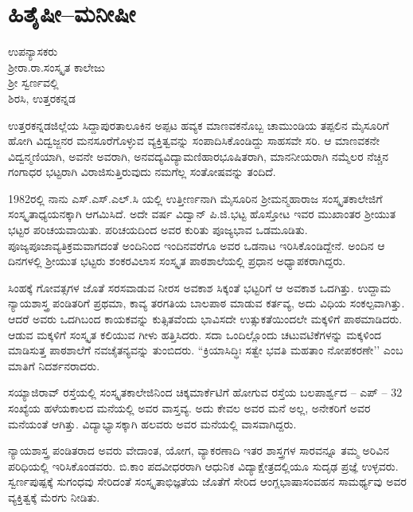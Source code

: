 {\fontsize{14}{16}\selectfont
\chapter{ಹಿತೈಷೀ–ಮನೀಷೀ}

\begin{center}
\smallskip

ಉಪನ್ಯಾಸಕರು\\ 
ಶ್ರೀರಾ.ರಾ.ಸಂಸ್ಕೃತ ಕಾಲೇಜು\\
ಶ್ರೀ ಸ್ವರ್ಣವಲ್ಲಿ\\
ಶಿರಸಿ, ಉತ್ತರಕನ್ನಡ
\addrule
\end{center}

ಉತ್ತರಕನ್ನಡಜಿಲ್ಲೆಯ ಸಿದ್ದಾಪುರತಾಲೂಕಿನ ಅಪ್ಪಟ ಹವ್ಯಕ ಮಾಣವಕನೊಬ್ಬ ಚಾಮುಂಡಿಯ ತಪ್ಪಲಿನ ಮೈಸೂರಿಗೆ ಹೋಗಿ ವಿದ್ವಜ್ಜನರ ಮನಸೂರೆಗೊಳ್ಳುವ ವ್ಯಕ್ತಿತ್ವವನ್ನು ಸಂಪಾದಿಸಿಕೊಂಡಿದ್ದು ಸಾಹಸವೇ ಸರಿ. ಆ ಮಾಣವಕನೇ ವಿದ್ವನ್ಮಣಿಯಾಗಿ, ಅವನೇ ಅವರಾಗಿ, ಅನವದ್ಯವಿದ್ಯಾಮಣಿಹಾರಭೂಷಿತರಾಗಿ, ಮಾನನೀಯರಾಗಿ ನಮ್ಮೆಲರ ನೆಚ್ಚಿನ ಗಂಗಾಧರ ಭಟ್ಟರಾಗಿ ವಿರಾಜಿಸುತ್ತಿರುವುದು ನಮಗೆಲ್ಲ ಸಂತೋಷವನ್ನು ತಂದಿದೆ.

1982ರಲ್ಲಿ ನಾನು  ಎಸ್.ಎಸ್.ಎಲ್.ಸಿ ಯಲ್ಲಿ ಉತ್ತೀರ್ಣನಾಗಿ ಮೈಸೂರಿನ ಶ್ರೀಮನ್ಮಹಾರಾಜ ಸಂಸ್ಕೃತಕಾಲೇಜಿಗೆ ಸಂಸ್ಕೃತಾಧ್ಯಯನಕ್ಕಾಗಿ ಆಗಮಿಸಿದೆ. ಅದೇ ವರ್ಷ ವಿದ್ವಾನ್ ಪಿ.ಜಿ.ಭಟ್ಟ ಹೊಸ್ತೋಟ ಇವರ ಮುಖಾಂತರ ಶ್ರೀಯುತ ಭಟ್ಟರ ಪರಿಚಯವಾಯಿತು. ಪರಿಚಯದಿಂದ ಅವರ ಕುರಿತು ಪೂಜ್ಯಭಾವ ಒಡಮೂಡಿತು. ಪೂಜ್ಯಪೂಜಾವ್ಯತಿಕ್ರಮವಾಗದಂತೆ ಅಂದಿನಿಂದ ಇಂದಿನವರೆಗೂ ಅವರ ಒಡನಾಟ ಇರಿಸಿಕೊಂಡಿದ್ದೇನೆ. ಅಂದಿನ ಆ ದಿನಗಳಲ್ಲಿ ಶ್ರೀಯುತ ಭಟ್ಟರು ಶಂಕರವಿಲಾಸ ಸಂಸ್ಕೃತ ಪಾಠಶಾಲೆಯಲ್ಲಿ ಪ್ರಧಾನ ಅಧ್ಯಾಪಕರಾಗಿದ್ದರು.

ಸಿಂಹಕ್ಕೆ ಗೋವತ್ಸಗಳ ಜೊತೆ ಸರಸವಾಡುವ ನೀರಸ ಅವಕಾಶ ಸಿಕ್ಕಂತೆ ಭಟ್ಟರಿಗೆ ಆ ಅವಕಾಶ ಒದಗಿತ್ತು. ಉದ್ದಾಮ ನ್ಯಾಯಶಾಸ್ತ್ರ ಪಂಡಿತರಿಗೆ ಪ್ರಥಮಾ, ಕಾವ್ಯ ತರಗತಿಯ ಬಾಲಪಾಠ ಮಾಡುವ ಕರ್ತವ್ಯ, ಅದು ವಿಧಿಯ ಸಂಕಲ್ಪವಾಗಿತ್ತು.  ಆದರೆ ಅವರು ಒದಗಿಬಂದ ಕಾಯಕವನ್ನು ಕುತ್ಸಿತವೆಂದು ಭಾವಿಸದೇ  ಉತ್ಸುಕತೆಯಿಂದಲೇ ಮಕ್ಕಳಿಗೆ ಪಾಠಮಾಡಿದರು. ಆಡುವ ಮಕ್ಕಳಿಗೆ ಸಂಸ್ಕೃತ ಕಲಿಯುವ ಗೀಳು ಹತ್ತಿಸಿದರು. ಸದಾ ಒಂದಿಲ್ಲೊಂದು ಚಟುವಟಿಕೆಗಳನ್ನು ಮಕ್ಕಳಿಂದ ಮಾಡಿಸುತ್ತ ಪಾಠಶಾಲೆಗೆ ನವಚೈತನ್ಯವನ್ನು ತುಂಬಿದರು. “ಕ್ರಿಯಾಸಿದ್ಧಿಃ ಸತ್ವೇ ಭವತಿ ಮಹತಾಂ ನೋಪಕರಣೇ’’ ಎಂಬ ಮಾತಿಗೆ ನಿದರ್ಶನರಾದರು.

ಸಯ್ಯಾಜಿರಾವ್ ರಸ್ತೆಯಲ್ಲಿ ಸಂಸ್ಕೃತಕಾಲೇಜಿನಿಂದ ಚಿಕ್ಕಮಾರ್ಕೆಟಿಗೆ ಹೋಗುವ ರಸ್ತೆಯ ಬಲಪಾರ್ಶ್ವದ – ಎಪ್ – 32 ಸಂಖ್ಯೆಯ ಹಳೆಯಕಾಲದ ಮನೆಯಲ್ಲಿ ಅವರ ವಾಸ್ತವ್ಯ. ಅದು ಕೇವಲ ಅವರ ಮನೆ ಅಲ್ಲ, ಅನೇಕರಿಗೆ ಅವರ ಮನೆಯಂತೆ ಆಗಿತ್ತು. ವಿದ್ಯಾಭ್ಯಾಸಕ್ಕಾಗಿ ಹಲವರು ಅವರ ಮನೆಯಲ್ಲಿ ವಾಸವಾಗಿದ್ದರು.

ನ್ಯಾಯಶಾಸ್ತ್ರ ಪಂಡಿತರಾದ ಅವರು ವೇದಾಂತ, ಯೋಗ, ವ್ಯಾಕರಣಾದಿ ಇತರ ಶಾಸ್ತ್ರಗಳ ಸಾರವನ್ನೂ ತಮ್ಮ ಅರಿವಿನ ಪರಿಧಿಯಲ್ಲಿ ಇರಿಸಿಕೊಂಡವರು. ಬಿ.ಕಾಂ ಪದವೀಧರರಾಗಿ ಆಧುನಿಕ ವಿದ್ಯಾಕ್ಷೇತ್ರದಲ್ಲಿಯೂ ಸುದೃಢ ಪ್ರಜ್ಞೆ ಉಳ್ಳವರು. ಸ್ವರ್ಣಪುಷ್ಪಕ್ಕೆ ಸುಗಂಧವು ಸೇರಿದಂತೆ ಸಂಸ್ಕೃತಾಭಿಜ್ಞತೆಯ ಜೊತೆಗೆ ಸೇರಿದ ಆಂಗ್ಲಭಾಷಾಸಂವಹನ ಸಾಮರ್ಥ್ಯವು ಅವರ ವ್ಯಕ್ತಿತ್ವಕ್ಕೆ ಮೆರಗು ನೀಡಿತು. 

}
